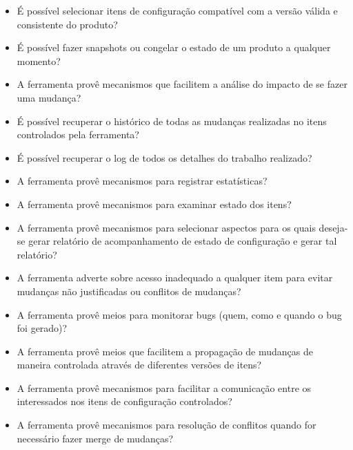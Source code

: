 \begin{itemize}
  
  \item É possível selecionar itens de configuração compatível com a versão válida e consistente do
  produto?
  \item É possível fazer snapshots ou congelar o estado de um produto a qualquer momento?
  \item A ferramenta provê mecanismos que facilitem a análise do impacto de se fazer uma mudança?
  \item É possível recuperar o histórico de todas as mudanças realizadas no itens controlados pela
  ferramenta?
  \item É possível recuperar o log de todos os detalhes do trabalho realizado?
  \item A ferramenta provê mecanismos para registrar estatísticas?
  \item A ferramenta provê mecanismos para examinar estado dos itens?
  \item A ferramenta provê mecanismos para selecionar aspectos para os quais deseja-se gerar relatório
  de acompanhamento de estado de configuração e gerar tal relatório?
  \item A ferramenta adverte sobre acesso inadequado a qualquer item para evitar mudanças não justificadas
  ou conflitos de mudanças?
  \item A ferramenta provê meios para monitorar bugs (quem, como e quando o bug foi gerado)?
  \item A ferramenta provê meios que facilitem a propagação de mudanças de maneira controlada
  através de diferentes versões de itens?
  \item A ferramenta provê mecanismos para facilitar a comunicação entre os interessados nos itens de
  configuração controlados?
  \item A ferramenta provê mecanismos para resolução de conflitos quando for necessário fazer merge
  de mudanças?
\end{itemize}
